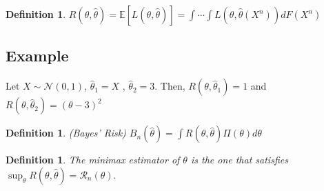 \documentclass[10pt]{article}
\newtheorem{definition}[def]{Definition}
\renewcommand{\hat}{\widehat}
\begin{document}
\begin{definition}
	$R(\theta, \hat{\theta}) = \mathbb{E}[L(\theta, \hat{\theta})] = \int \cdots \int L(\theta, \hat{\theta}(X^{n})) d F(X^n)$
\end{definition}

\subsection{Example}
Let $X \sim \mathcal{N}(0,1)$, $\hat{\theta}_{1} = X$ , $\hat{\theta}_{2} = 3$. Then,
$R(\theta, \hat{\theta}_{1}) = 1$ and $R(\theta, \hat{\theta}_{2}) = (\theta - 3)^2$  

\begin{definition}(Bayes' Risk)
	$B_n(\hat{\theta}) = \int R(\theta, \hat{\theta}) \Pi(\theta) d \theta$	
\end{definition}	

\begin{definition}
	The minimax estimator of $\theta$ is the one that satisfies $\sup_{\theta} R(\theta, \hat{\theta}) = \mathcal{R}_{n}(\theta).$
\end{definition}
	
	
	
\end{document}
